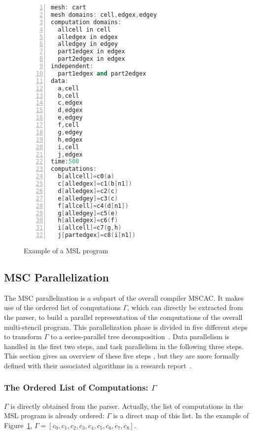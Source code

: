 \begin{figure}[t]
\begin{lstlisting}[basicstyle=\small,mathescape,frame=single,language=C++,numbers=left]
mesh: cart
mesh domains: cell,edgex,edgey
computation domains:
  allcell in cell
  alledgex in edgex
  alledgey in edgey
  part1edgex in edgex
  part2edgex in edgex
independent:
  part1edgex and part2edgex
data:
  a,cell
  b,cell
  c,edgex
  d,edgex
  e,edgey
  f,cell
  g,edgey
  h,edgex
  i,cell
  j,edgex
time:500
computations:
  b[allcell]=c0(a)
  c[alledgex]=c1(b[n1])
  d[alledgex]=c2(c)
  e[alledgey]=c3(c)
  f[allcell]=c4(d[n1])
  g[alledgey]=c5(e)
  h[alledgex]=c6(f)
  i[allcell]=c7(g,h)
  j[partedgex]=c8(i[n1])
\end{lstlisting}
\caption{Example of a MSL program}
\label{fig:mslex}
\end{figure}

\subsection{MSC Parallelization}
The MSC parallelization is a subpart of the overall compiler MSCAC.
It makes use of the ordered list of computations $\Gamma$, which can directly be extracted from the parser, to build a parallel representation of the computations of the overall multi-stencil program.
This parallelization phase is divided in five different steps to transform $\Gamma$ to a series-parallel tree decomposition~\cite{Valdes:1979:RSP:800135.804393}.
Data parallelism is handled in the first two steps, and task parallelism in the following three steps.
This section gives an overview of these five steps , but they are more formally defined with their associated algorithms in a research report~\cite{????}.

\subsubsection*{The Ordered List of Computations: $\Gamma$}
$\Gamma$ is directly obtained from the parser. Actually, the list of computations in the MSL program is already ordered: $\Gamma$ is a direct map of this list. In the example of Figure~\ref{fig:mslex}, $\Gamma = [c_0,c_1,c_2,c_3,c_4,c_5,c_6,c_7,c_8]$.

